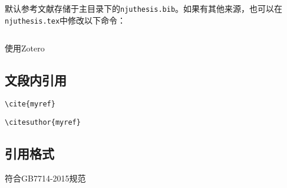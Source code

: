 默认参考文献存储于主目录下的\lstinline|njuthesis.bib|。如果有其他来源，也可以在\lstinline|njuthesis.tex|中修改以下命令：
\begin{lstlisting}[language=TeX]

\end{lstlisting}

使用Zotero

\subsection{文段内引用}

\lstinline|\cite{myref}|

\lstinline|\citesuthor{myref}|

\subsection{引用格式}

符合GB7714-2015规范
